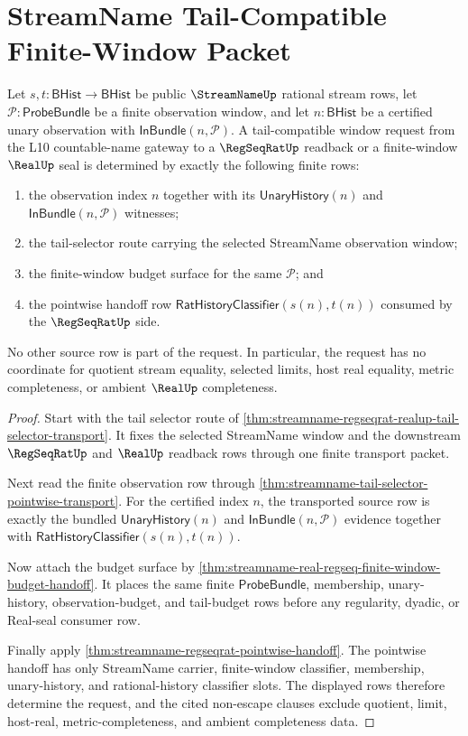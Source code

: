 \section{StreamName Tail-Compatible Finite-Window Packet}
\label{sec:streamname-tail-compatible-finite-window-packet}

\begin{theorem}
\label{thm:streamname-tail-compatible-window-request}
Let $s,t:\mathsf{BHist}\to\mathsf{BHist}$ be public $\StreamNameUp$ rational
stream rows, let $\mathcal P:\mathsf{ProbeBundle}$ be a finite observation
window, and let $n:\mathsf{BHist}$ be a certified unary observation with
$\mathsf{InBundle}(n,\mathcal P)$. A tail-compatible window request from the
L10 countable-name gateway to a $\RegSeqRatUp$ readback or a finite-window
$\RealUp$ seal is determined by exactly the following finite rows:
\begin{enumerate}
\item the observation index $n$ together with its $\mathsf{UnaryHistory}(n)$
and $\mathsf{InBundle}(n,\mathcal P)$ witnesses;
\item the tail-selector route carrying the selected StreamName observation
window;
\item the finite-window budget surface for the same $\mathcal P$; and
\item the pointwise handoff row
$\mathsf{RatHistoryClassifier}(s(n),t(n))$ consumed by the $\RegSeqRatUp$
side.
\end{enumerate}
No other source row is part of the request. In particular, the request has no
coordinate for quotient stream equality, selected limits, host real equality,
metric completeness, or ambient $\RealUp$ completeness.
\end{theorem}
\begin{proof}
Start with the tail selector route of
\autoref{thm:streamname-regseqrat-realup-tail-selector-transport}. It fixes
the selected StreamName window and the downstream $\RegSeqRatUp$ and $\RealUp$
readback rows through one finite transport packet.

Next read the finite observation row through
\autoref{thm:streamname-tail-selector-pointwise-transport}. For the certified
index $n$, the transported source row is exactly the bundled
$\mathsf{UnaryHistory}(n)$ and $\mathsf{InBundle}(n,\mathcal P)$ evidence
together with $\mathsf{RatHistoryClassifier}(s(n),t(n))$.

Now attach the budget surface by
\autoref{thm:streamname-real-regseq-finite-window-budget-handoff}. It places
the same finite $\mathsf{ProbeBundle}$, membership, unary-history,
observation-budget, and tail-budget rows before any regularity, dyadic, or
Real-seal consumer row.

Finally apply \autoref{thm:streamname-regseqrat-pointwise-handoff}. The
pointwise handoff has only StreamName carrier, finite-window classifier,
membership, unary-history, and rational-history classifier slots. The
displayed rows therefore determine the request, and the cited non-escape
clauses exclude quotient, limit, host-real, metric-completeness, and ambient
completeness data.
\end{proof}

